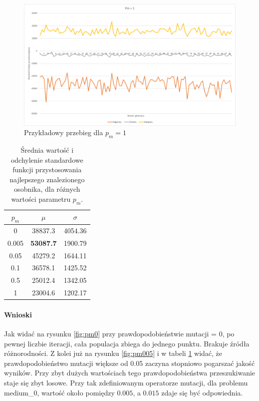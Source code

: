 \documentclass{article}
\begin{document}
	\begin{figure}[H]
		\centering
		\includegraphics[width=1\linewidth]{pm1.png}
		\caption{Przykładowy przebieg dla $p_m=1$}
		\label{fig:pm1}
	\end{figure}
	
	\begin{table}[H]
		\begin{center}
			\begin{tabular}{ |c|c|c| } 
				\hline
				$p_m$ & $\mu$ & $\sigma$ \\ 
				\hline
				0 & 38837.3 & 4054.36 \\ 
				0.005 & \textbf{53087.7} & 1900.79 \\ 
				0.05 & 45279.2 & 1644.11 \\ 
				0.1 & 36578.1 & 1425.52 \\ 
				0.5 & 25012.4 & 1342.05 \\ 
				1 & 23004.6 & 1202.17 \\ 
				\hline
			\end{tabular}
			\caption{Średnia wartość i odchylenie standardowe funkcji przystosowania najlepszego znalezionego osobnika, dla różnych wartości parametru $p_m$.}
			\label{tab:mut}
		\end{center}
	\end{table}
	
	\paragraph{Wnioski}
	Jak widać na rysunku \ref{fig:pm0} przy prawdopodobieństwie mutacji = 0, po pewnej liczbie iteracji, cała populacja zbiega do jednego punktu. Brakuje źródła różnorodności. Z kolei już na rysunku \ref{fig:pm005} i w tabeli \ref{tab:mut} widać, że prawdopodobieństwo mutacji większe od 0.05 zaczyna stopniowo pogarszać jakość wyników. Przy zbyt dużych wartościach tego prawdopodobieństwa przeszukiwanie staje się zbyt losowe. Przy tak zdefiniowanym operatorze mutacji, dla problemu medium\_0, wartość około pomiędzy $0.005$, a $0.015$ zdaje się być odpowiednia.
	
\end{document}
